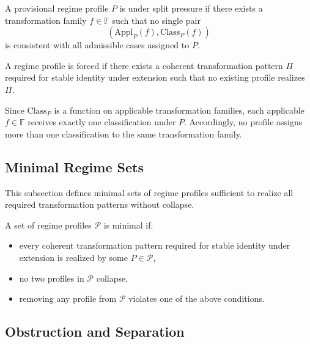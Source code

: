 \begin{definition}
  \label{def:split_pressure}
  A provisional regime profile $P$ is under split pressure if there exists a transformation
  family $f \in \mathbb{F}$ such that no single pair
  \[
    (\mathrm{Appl}_P(f), \mathrm{Class}_P(f))
  \]
  is consistent with all admissible cases assigned to $P$.
\end{definition}

\begin{definition}
  \label{def:forced_regime_profile}
  A regime profile is forced if there exists a coherent transformation pattern $\Pi$
  required for stable identity under extension such that no existing profile realizes $\Pi$.
\end{definition}


  Since $\mathrm{Class}_P$ is a function on applicable
  transformation families, each applicable $f \in \mathbb{F}$ receives
  exactly one classification under $P$.
  Accordingly, no profile assigns more than one classification
  to the same transformation family.


\subsection{Minimal Regime Sets}
\label{subsec:minimal_sets}

This subsection defines minimal sets of regime profiles
sufficient to realize all required transformation patterns without collapse.

\begin{definition}
  \label{def:minimal_regime_set}
  A set of regime profiles $\mathcal{P}$ is minimal if:
  \begin{itemize}
    \item every coherent transformation pattern required for stable identity under extension
          is realized by some $P \in \mathcal{P}$,
    \item no two profiles in $\mathcal{P}$ collapse,
    \item removing any profile from $\mathcal{P}$ violates one of the above conditions.
  \end{itemize}
\end{definition}

\subsection{Obstruction and Separation}
\label{subsec:obstruction}

